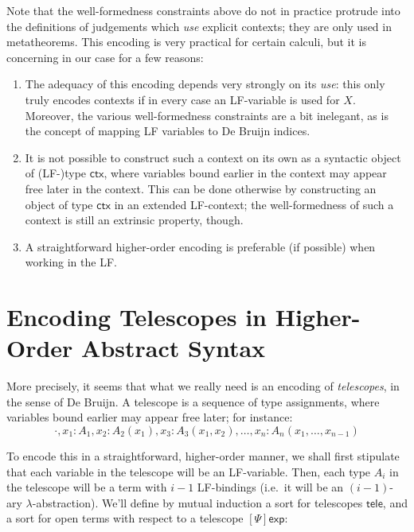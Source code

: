 \documentclass[acmtoplas]{acmtrans2m}
\newcommand\sortexp{\mathsf{exp}}
\newcommand\sortctx{\mathsf{ctx}}
\newcommand\sorttele{\mathsf{tele}}
\newcommand\sortoexp[1]{[#1]\sortexp}
\begin{document}
Note that the well-formedness constraints above do not in practice protrude
into the definitions of judgements which \emph{use} explicit contexts; they are
only used in metatheorems. This encoding is very practical for certain calculi,
but it is concerning in our case for a few reasons:

\begin{enumerate}

  \item The adequacy of this encoding depends very strongly on its
    \emph{use}: this only truly encodes contexts if in every case an LF-variable
    is used for $X$.  Moreover, the various well-formedness constraints are a
    bit inelegant, as is the concept of mapping LF variables to De Bruijn indices.

  \item It is not possible to construct such a context on its own as a
    syntactic object of (LF-)type $\sortctx$, where variables bound earlier in
    the context may appear free later in the context. This can be done
    otherwise by constructing an object of type $\sortctx$ in an extended
    LF-context; the well-formedness of such a context is still an extrinsic
    property, though.

  \item A straightforward higher-order encoding is preferable (if possible)
    when working in the LF.

\end{enumerate}

\section{Encoding Telescopes in Higher-Order Abstract Syntax}
More precisely, it seems that what we really need is an encoding of
\emph{telescopes}, in the sense of De
Bruijn\cite{Bruijn91telescopicmappings}. A telescope is a sequence of
type assignments, where variables bound earlier may appear free later;
for instance:
\[
  \cdot,x_1:A_1, x_2:A_2(x_1), x_3:A_3(x_1,x_2), \dots, x_n:A_n(x_1,\dots,x_{n-1})
\]

To encode this in a straightforward, higher-order manner, we shall first
stipulate that each variable in the telescope will be an LF-variable. Then,
each type $A_i$ in the telescope will be a term with $i-1$ LF-bindings (i.e.\ it
will be an $(i-1)$-ary $\lambda$-abstraction). We'll define by mutual induction a
sort for telescopes $\sorttele$, and a sort for open terms with respect to a
telescope $\sortoexp{\Psi}$:
\end{document}
